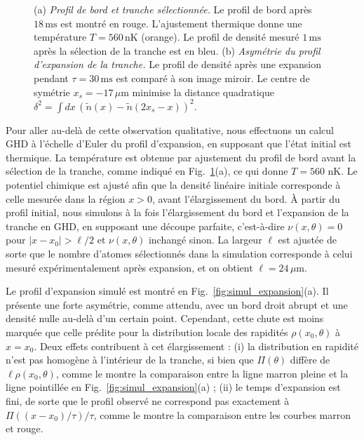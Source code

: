 \begin{figure}[!htb]
\centering
{}
\caption{(a) {\it Profil de bord et tranche sélectionnée.} Le profil de bord après $18\,\mathrm{ms}$ est montré en rouge. L'ajustement thermique donne une température $T = 560\,\mathrm{nK}$ (orange). Le profil de densité mesuré $1\,\mathrm{ms}$ après la sélection de la tranche est en bleu. (b) {\it Asymétrie du profil d’expansion de la tranche.} Le profil de densité après une expansion pendant $\tau = 30\,\mathrm{ms}$ est comparé à son image miroir. Le centre de symétrie $x_s = -17\,\mu$m minimise la distance quadratique $\delta^2 = \int dx\, (\tilde{n}(x) - \tilde{n}(2x_s - x))^2$.}
\label{fig:simul_deformation}
\end{figure}

Pour aller au-delà de cette observation qualitative, nous effectuons un calcul GHD à l’échelle d’Euler du profil d’expansion, en supposant que l’état initial est thermique.  
La température est obtenue par ajustement du profil de bord avant la sélection de la tranche, comme indiqué en Fig.~\ref{fig:simul_deformation}(a), ce qui donne $T = 560$ nK.  
Le potentiel chimique est ajusté afin que la densité linéaire initiale corresponde à celle mesurée dans la région $x > 0$, avant l’élargissement du bord.  
À partir du profil initial, nous simulons à la fois l’élargissement du bord et l’expansion de la tranche en GHD, en supposant une découpe parfaite, c’est-à-dire $\nu(x,\theta) = 0$ pour $|x - x_0| > \ell/2$ et $\nu(x,\theta)$ inchangé sinon.  
La largeur $\ell$ est ajustée de sorte que le nombre d’atomes sélectionnés dans la simulation corresponde à celui mesuré expérimentalement après expansion, et on obtient $\ell = 24\,\mu$m.  

Le profil d’expansion simulé est montré en Fig.~\ref{fig:simul_expansion}(a).  
Il présente une forte asymétrie, comme attendu, avec un bord droit abrupt et une densité nulle au-delà d’un certain point.  
Cependant, cette chute est moins marquée que celle prédite pour la distribution locale des rapidités $\rho(x_0,\theta)$ à $x = x_0$. Deux effets contribuent à cet élargissement :  
(i) la distribution en rapidité n’est pas homogène à l’intérieur de la tranche, si bien que $\Pi(\theta)$ diffère de $\ell \rho(x_0,\theta)$, comme le montre la comparaison entre la ligne marron pleine et la ligne pointillée en Fig.~\ref{fig:simul_expansion}(a) ;  
(ii) le temps d’expansion est fini, de sorte que le profil observé ne correspond pas exactement à $\Pi((x-x_0)/\tau)/\tau$, comme le montre la comparaison entre les courbes marron et rouge.




